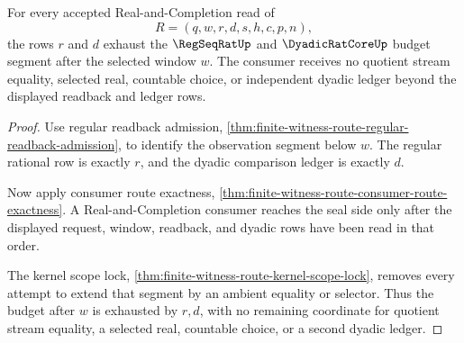 \begin{theorem}
\label{thm:finite-witness-route-regseq-budget-exhaustion}
For every accepted Real-and-Completion read of
$$
R=(q,w,r,d,s,h,c,p,n),
$$
the rows $r$ and $d$ exhaust the $\RegSeqRatUp$ and $\DyadicRatCoreUp$ budget segment after the selected window $w$. The consumer receives no quotient stream equality, selected real, countable choice, or independent dyadic ledger beyond the displayed readback and ledger rows.
\end{theorem}
\begin{proof}
Use regular readback admission, \autoref{thm:finite-witness-route-regular-readback-admission}, to identify the observation segment below $w$. The regular rational row is exactly $r$, and the dyadic comparison ledger is exactly $d$.

Now apply consumer route exactness, \autoref{thm:finite-witness-route-consumer-route-exactness}. A Real-and-Completion consumer reaches the seal side only after the displayed request, window, readback, and dyadic rows have been read in that order.

The kernel scope lock, \autoref{thm:finite-witness-route-kernel-scope-lock}, removes every attempt to extend that segment by an ambient equality or selector. Thus the budget after $w$ is exhausted by $r,d$, with no remaining coordinate for quotient stream equality, a selected real, countable choice, or a second dyadic ledger.
\end{proof}

